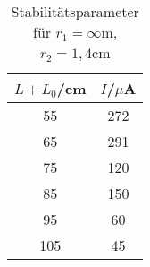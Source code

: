 \begin{table}[H]
	\begin{center}
		\begin{tabular}{c c}
			\toprule
			\(L+L_0\)/cm & \(I\)/\(\mu\)A \\
			\midrule
			55              &272          \\                                                                           
			65              &291        \\                                                                             
			75              &120      \\                                                                               
			85              &150    \\                                                                                 
			95              &60    \\                                                                                  
			105             &45 \\
			\bottomrule
		\end{tabular}
		\caption{Stabilitätsparameter für \(r_1=\infty\text{m}\), \(r_2=1,4\)cm}
		\label{fig:t2}
	\end{center}
\end{table}


